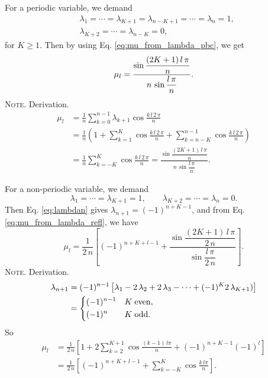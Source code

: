 \documentclass[reprint, floatfix]{revtex4-1}
\newcommand{\note}[1]{{\color{DarkGreen}\footnotesize \textsc{Note.} #1}}
\begin{document}
For a periodic variable, we demand
%
$$
\begin{aligned}
&
\lambda_1 = \cdots = \lambda_{K+1}
= \lambda_{n-K+1} = \cdots = \lambda_n = 1,
\\
&
\lambda_{K+2} = \cdots = \lambda_{n-K} = 0,
\end{aligned}
$$
for $K \ge 1$.
%
Then by using
Eq. \eqref{eq:mu_from_lambda_pbc},
we get
\begin{equation}
  \mu_l
  =
  \frac{
    \sin
    \dfrac{ (2 K + 1) \, l \, \pi }
         {              n        }
  }
  {
    n \, \sin \dfrac{ l \, \pi } { n }
  }
  .
\notag
\end{equation}
\note{Derivation.
$$
\begin{aligned}
\mu_l
&=
\frac 1 n \sum_{k = 0}^{n-1} \lambda_{k+1} \cos \frac{ k \, l \, 2 \, \pi } { n }
\\
&=
\frac{1}{n}
\left(
  1 +
  \sum_{k=1}^K
  \cos \frac { k \, l \, 2 \, \pi } { n }
  +
  \sum_{k=n-K}^{n-1}
  \cos \frac { k \, l \, 2 \, \pi } { n }
\right)
\\
&=
\frac 1 n
\sum_{k=-K}^K
\cos \frac { k \, l \, 2 \, \pi } { n }
=
  \frac{
    \sin
    \dfrac{ (2 K + 1) \, l \, \pi }
         {              n        }
  }
  {
    n \, \sin \dfrac{ l \, \pi } { n }
  }
.
\end{aligned}
$$
}

For a non-periodic variable, we demand
$$
\lambda_1 = \cdots = \lambda_{K+1} = 1,
\qquad
\lambda_{K+2} = \cdots = \lambda_n = 0.
$$
Then Eq. \eqref{eq:lambdan} gives
$\lambda_{n+1} = (-1)^{n+K-1}$,
and from Eq. \eqref{eq:mu_from_lambda_refl},
we have
\begin{equation}
  \mu_l
  =
  \frac{1}{2 \, n}
  \left[
    (-1)^{n+K+l-1}
    +
    \frac{
      \sin
      \dfrac{ (2 K + 1) \, l \, \pi }
           {         2 \, n        }
    }
    {
      \sin \dfrac{ l \, \pi } { 2 \, n }
    }
  \right]
  .
\label{eq:mu_sinc_refl}
\end{equation}
\note{Derivation.
$$
\begin{aligned}
  \lambda_{n+1}
  &=
  (-1)^{n-1}
  \left[
    \lambda_1
    - 2 \, \lambda_2
    + 2 \, \lambda_3 - \cdots
    + (-1)^{K} 2 \, \lambda_{K+1})
  \right]
  \\
  &=
  \begin{dcases}
    (-1)^{n-1} & K \mathrm{\; even,} \\
    (-1)^n     & K \mathrm{\; odd.}
  \end{dcases}
\end{aligned}
$$
So
$$
\begin{aligned}
  \mu_l
  &=
  \frac{1}{2\,n}
  \left[
    1 +
    2 \sum_{k=2}^{K+1}
    \cos \frac { (k - 1) \, l \pi } { n }
    +
    (-1)^{n+K-1} (-1)^l
  \right]
  \\
  &=
  \frac{1}{2\,n}
  \left[
    (-1)^{n+K+l-1}
    +
    \sum_{k=-K}^{K}
    \cos \frac { k \, l \pi } { n }
  \right]
  .
\end{aligned}
$$
}%
\end{document}
